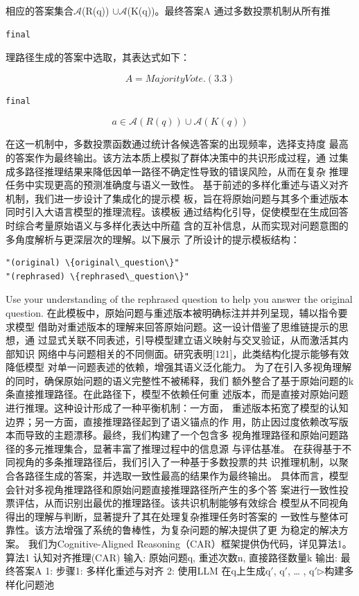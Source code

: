\documentclass[12pt,a4paper,openright,UTF8]{ctexbook}
\begin{document}
相应的答案集合$\mathcal{A}$(R(q)) $\cup$$\mathcal{A}$(K(q))。最终答案A 通过多数投票机制从所有推

\begin{lstlisting}
final
\end{lstlisting}
理路径生成的答案中选取，其表达式如下：

\begin{equation*}
A =MajorityVote.(3.3)
\end{equation*}

\begin{lstlisting}
final
\end{lstlisting}

\begin{equation*}
a\in{\mathcal{A}(R(q))\cup\mathcal{A}(K(q))}
\end{equation*}

在这一机制中，多数投票函数通过统计各候选答案的出现频率，选择支持度 最高的答案作为最终输出。该方法本质上模拟了群体决策中的共识形成过程，通 过集成多路径推理结果来降低因单一路径不确定性导致的错误风险，从而在复杂 推理任务中实现更高的预测准确度与语义一致性。 基于前述的多样化重述与语义对齐机制，我们进一步设计了集成化的提示模 板，旨在将原始问题与其多个重述版本同时引入大语言模型的推理流程。该模板 通过结构化引导，促使模型在生成回答时综合考量原始语义与多样化表达中所蕴 含的互补信息，从而实现对问题意图的多角度解析与更深层次的理解。以下展示 了所设计的提示模板结构：

\begin{lstlisting}
"(original) \{original\_question\}"
"(rephrased) \{rephrased\_question\}"
\end{lstlisting}
Use your understanding of the rephrased question to help you answer the original question. 在此模板中，原始问题与重述版本被明确标注并并列呈现，辅以指令要求模型 借助对重述版本的理解来回答原始问题。这一设计借鉴了思维链提示的思想，通 过显式关联不同表述，引导模型建立语义映射与交叉验证，从而激活其内部知识 网络中与问题相关的不同侧面。研究表明[121]，此类结构化提示能够有效降低模型 对单一问题表述的依赖，增强其语义泛化能力。 为了在引入多视角理解的同时，确保原始问题的语义完整性不被稀释，我们 额外整合了基于原始问题的k条直接推理路径。在此路径下，模型不依赖任何重 述版本，而是直接对原始问题进行推理。这种设计形成了一种平衡机制：一方面， 重述版本拓宽了模型的认知边界；另一方面，直接推理路径起到了语义锚点的作 用，防止因过度依赖改写版本而导致的主题漂移。最终，我们构建了一个包含多 视角推理路径和原始问题路径的多元推理集合，显著丰富了推理过程中的信息源 与评估基准。 在获得基于不同视角的多条推理路径后，我们引入了一种基于多数投票的共 识推理机制，以聚合各路径生成的答案，并选取一致性最高的结果作为最终输出。 具体而言，模型会针对多视角推理路径和原始问题直接推理路径所产生的多个答 案进行一致性投票评估，从而识别出最优的推理路径。该共识机制能够有效综合 模型从不同视角得出的理解与判断，显著提升了其在处理复杂推理任务时答案的 一致性与整体可靠性。该方法增强了系统的鲁棒性，为复杂问题的解决提供了更 为稳定的解决方案。 我们为Cognitive-Aligned Reasoning（CAR）框架提供伪代码，详见算法1。 算法1 认知对齐推理(CAR) 输入: 原始问题q, 重述次数n, 直接路径数量k 输出: 最终答案A 1: 步骤1: 多样化重述与对齐 2: 使用LLM 在q上生成q$'$, q$'$, … , q$'$$\triangleright$构建多样化问题池
\end{document}
